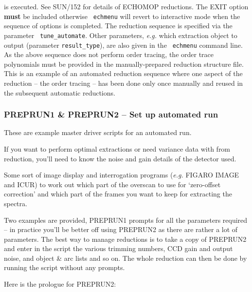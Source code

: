 \documentclass[twoside,11pt]{article}
\newcommand{\stardocinitials}  {SC}
\newcommand{\stardocnumber}    {3.2-0} %
\newcommand{\stardocname}{\stardocinitials /\stardocnumber}
\newcommand{\xref}[3]{#1}
\newcommand{\xlabel}[1]{}
\newcommand{\scspec}[2]{#1}
\newcommand{\scspec}[2]{#2}
\begin{document}
is executed.  See \xref{SUN/152}{sun152}{} for details of ECHOMOP reductions.
The EXIT option {\bf must} be included otherwise {\tt
echmenu} will revert to interactive mode when the sequence of options is
completed.  The reduction sequence is specified via the parameter {\tt
tune\_automate}\@.  Other parameters, {\it{e.g.}} which extraction object
to output (parameter {\tt result\_type}), are also given in the {\tt
echmenu} command line.  As the above sequence does not perform order tracing,
the order trace polynomials must be provided in the manually-prepared
reduction structure file.  This is an example of an automated reduction
sequence where one aspect of the reduction \scspec{--}{-} the order tracing
\scspec{--}{-} has been done only once manually and reused in the subsequent
automatic reductions.


\subsubsection{\label{se_preprun}\xlabel{preprun}PREPRUN1 \& PREPRUN2
               \scspec{--}{-} Set up automated run}
\markboth{PREPRUN}{\stardocname}

These are example master driver scripts for an automated run.

If you want to perform optimal extractions or need variance data with
from reduction,  you'll need to know the noise and gain details of the
detector used.

Some sort of image display and interrogation programs ({\it{e.g.}}
\xref{FIGARO}{sun86}{} \xref{IMAGE}{sun86}{IMAGE} and
\xref{ICUR}{sun86}{ICUR}) to work out which part of the overscan to use for
`zero-offset correction' and which part of the frames you want to keep for
extracting the spectra.

Two examples are provided, PREPRUN1 prompts for all the parameters required
\scspec{--}{-} in practice you'll be better off using PREPRUN2 as there are
rather a lot of parameters.  The best way to manage reductions is to take a
copy of PREPRUN2 and enter in the script the various trimming numbers,
CCD gain and output noise, and object \& arc lists and so on.  The whole
reduction can then be done by running the script without any prompts.

Here is the prologue for PREPRUN2:
\end{document}
